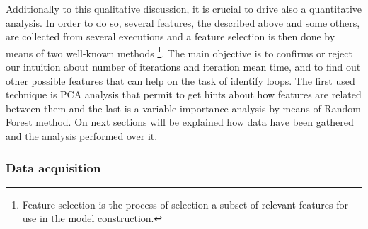 Additionally to this qualitative discussion, it is crucial to drive also a 
quantitative analysis. In order to do so, 
several features, the described above and some others, are collected from several 
executions and a feature selection is then done by means of two well-known methods
\footnote{Feature selection is
the process of selection a subset of relevant features for use in the model
construction.}.
The main objective is to confirms or reject our intuition about number of
iterations and iteration mean time, and to find out other possible features that
can help on the task of identify loops.
The first used technique is PCA analysis that permit to get hints 
about how features are related between them and the last is a variable 
importance analysis by means of Random Forest method. On next sections will be 
explained how data have been gathered and the analysis performed over it.  

\subsubsection{Data acquisition}

